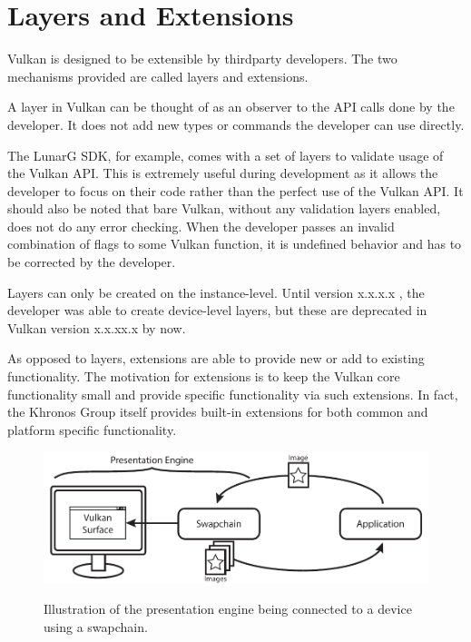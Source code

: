   \section{Layers and Extensions}
  \label{sec:LayersAndExtensions}

    Vulkan is designed to be extensible by thirdparty developers. The two mechanisms provided are called layers and extensions.

    A layer in Vulkan can be thought of as an observer to the API calls done by the developer. It does not add new types or commands the developer can use directly.

    The LunarG SDK, for example, comes with a set of layers to validate usage of the Vulkan API. This is extremely useful during development as it allows the developer to focus on their code rather than the perfect use of the Vulkan API. It should also be noted that bare Vulkan, without any validation layers enabled, does not do any error checking. When the developer passes an invalid combination of flags to some Vulkan function, it is undefined behavior and has to be corrected by the developer.

    Layers can only be created on the instance-level. Until version x.x.x.x , the developer was able to create device-level layers, but these are deprecated in Vulkan version x.x.xx.x by now.


    As opposed to layers, extensions are able to provide new or add to existing functionality. The motivation for extensions is to keep the Vulkan core functionality small and provide specific functionality via such extensions. In fact, the Khronos Group itself provides built-in extensions for both common and platform specific functionality.

    \begin{figure}
      \caption{Illustration of the presentation engine being connected to a device using a swapchain.}
      \centering
      \includegraphics{Main/Images/PresentationEngine}
      \label{fig:PresentationEngine}
    \end{figure}

